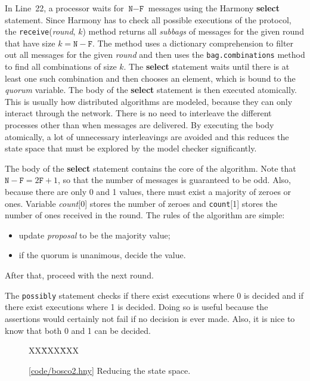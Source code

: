 \documentclass{report}
\newcommand{\harmonysource}[1]{
\begin{tabbing}
XX\=XXX\=XXX\kill
    
\end{tabbing}
}
\newcommand{\harmonylink}[1]{%
[\href{https://harmony.cs.cornell.edu/#1}{\underline{#1}}]%
}
\newenvironment{code}{
\tcolorbox
}{
\endtcolorbox
}
\begin{document}
In Line~22, a processor waits for $\texttt{N} - \texttt{F}$ messages using
the Harmony \textbf{select} statement.
Since Harmony has to check all possible executions of the protocol, the
\texttt{receive}(\textit{round}, $k$) method returns all \emph{subbags} of messages
for the given round that have size $k = \texttt{N} - \texttt{F}$.  The method uses a
dictionary comprehension to filter out all messages for the given \textit{round}
and then uses the \texttt{bag.combinations} method to find all combinations of size $k$.
The \textbf{select} statement waits until there is at least one such combination and
then chooses an element, which is bound to the \textit{quorum} variable.
The body of the \textbf{select} statement is then executed atomically.
This is usually how distributed algorithms are modeled, because they can only interact
through the network.  There is no need to interleave the different processes other
than when messages are delivered.  By executing the body atomically, a lot of
unnecessary interleavings are avoided and this reduces the state space that must
be explored by the model checker significantly.

The body of the \textbf{select} statement contains the core of the algorithm.
Note that $\texttt{N} - \texttt{F} = 2\texttt{F} + 1$, so that the number of
messages is guaranteed to be odd.  Also, because there are only 0 and 1 values, there
must exist a majority of zeroes or ones.  Variable \textit{count}[0] stores the number
of zeroes and \texttt{count}[1] stores the number of ones received in the round.
The rules of the algorithm are simple:
\begin{itemize}
\item update \textit{proposal} to be the majority value;
\item if the quorum is unanimous, decide the value.
\end{itemize}
After that, proceed with the next round.

The \texttt{possibly} statement checks if there exist executions where 0 is
decided and if there exist executions where 1 is decided.  Doing so is useful
because the assertions would certainly not fail if no decision is ever made.
Also, it is nice to know that both 0 and 1 can be decided.

\begin{figure}
\begin{code}
\harmonysource{bosco2}
\end{code}
\caption{\harmonylink{code/bosco2.hny} Reducing the state space.}
\label{fig:bosco2}
\end{figure}
\end{document}
